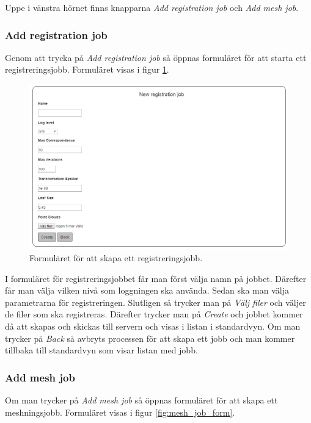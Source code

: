\documentclass[a4paper,titlepage,12pt]{article}
\begin{document}
	Uppe i vänstra hörnet finns knapparna \textit{Add registration job} och \textit{Add mesh job}.
	
	\subsubsection{Add registration job}
	
	Genom att trycka på \textit{Add registration job} så öppnas formuläret för att starta ett registreringsjobb. Formuläret visas i figur \ref{fig:reg_job_form}.
	
	\begin{figure}[H]
		\centering
		\includegraphics[width=160mm]{images/reg_job_form.PNG}
		\caption{Formuläret för att skapa ett registreringsjobb.}
		\label{fig:reg_job_form}
	\end{figure}

	I formuläret för registreringsjobbet får man först välja namn på jobbet. Därefter får man välja vilken nivå som loggningen ska använda. Sedan ska man välja parametrarna för registreringen. Slutligen så trycker man på \textit{Välj filer} och väljer de filer som ska registreras. Därefter trycker man på \textit{Create} och jobbet kommer då att skapas och skickas till servern och visas i listan i standardvyn. Om man trycker på \textit{Back} så avbryts processen för att skapa ett jobb och man kommer tillbaka till standardvyn som visar listan med jobb.
	
	\subsubsection{Add mesh job}
	
	Om man trycker på \textit{Add mesh job} så öppnas formuläret för att skapa ett meshningsjobb. Formuläret visas i figur \ref{fig:mesh_job_form}.
	
\end{document}
